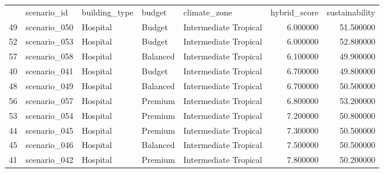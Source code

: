 \begin{tabular}{lllllrr}
 & scenario_id & building_type & budget & climate_zone & hybrid_score & sustainability \\
49 & scenario_050 & Hospital & Budget & Intermediate Tropical & 6.000000 & 51.500000 \\
52 & scenario_053 & Hospital & Budget & Intermediate Tropical & 6.000000 & 52.800000 \\
57 & scenario_058 & Hospital & Balanced & Intermediate Tropical & 6.100000 & 49.900000 \\
40 & scenario_041 & Hospital & Budget & Intermediate Tropical & 6.700000 & 49.800000 \\
48 & scenario_049 & Hospital & Balanced & Intermediate Tropical & 6.700000 & 50.500000 \\
56 & scenario_057 & Hospital & Premium & Intermediate Tropical & 6.800000 & 53.200000 \\
53 & scenario_054 & Hospital & Premium & Intermediate Tropical & 7.200000 & 50.800000 \\
44 & scenario_045 & Hospital & Premium & Intermediate Tropical & 7.300000 & 50.500000 \\
45 & scenario_046 & Hospital & Balanced & Intermediate Tropical & 7.500000 & 50.500000 \\
41 & scenario_042 & Hospital & Premium & Intermediate Tropical & 7.800000 & 50.200000 \\
\end{tabular}

